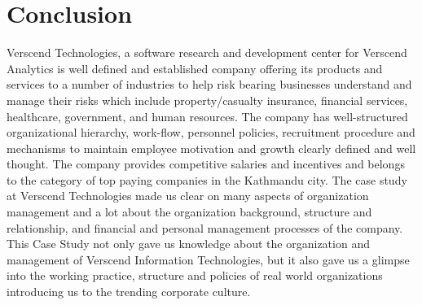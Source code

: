\section{Conclusion}
Verscend Technologies, a software research and development center for Verscend Analytics is well
defined and established company offering its products and services to a number of industries to help risk
bearing businesses understand and manage their risks which include property/casualty insurance, financial
services, healthcare, government, and human resources. The company has well-structured organizational
hierarchy, work-flow, personnel policies, recruitment procedure and mechanisms to maintain employee
motivation and growth clearly defined and well thought. The company provides competitive salaries and
incentives and belongs to the category of top paying companies in the Kathmandu city.
The case study at Verscend Technologies made us clear on many aspects of organization
management and a lot about the organization background, structure and relationship, and financial and
personal management processes of the company.
This Case Study not only gave us knowledge about the organization and management of Verscend Information
Technologies, but it also gave us a glimpse into the working practice, structure and policies of real world
organizations introducing us to the trending corporate culture.
\cleardoublepage
